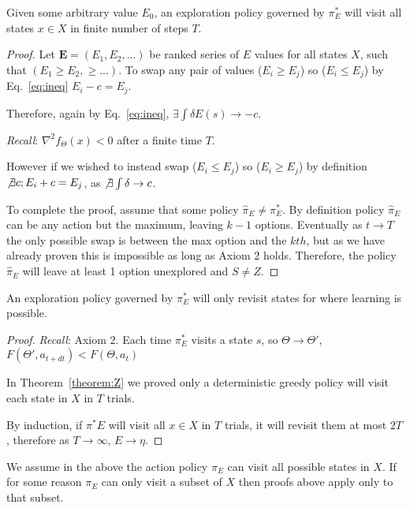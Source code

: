 \begin{theorem} \label{theorem:Z} 
	Given some arbitrary value $E_0$, an exploration policy governed by $\pi^*_E$ will visit all states $x \in X$ in finite number of steps $T$.
\end{theorem}
\begin{proof}
	Let $\mathbf{E} = (E_1, E_2, ...)$ be ranked series of $E$ values for all states $X$, such that $(E_1 \geq E_2, \geq ...)$. To swap any pair of values ($E_i \geq E_j$) so ($E_i \leq E_j$) by Eq.~\ref{eq:ineq} $E_i - c = E_j$. 
	
	Therefore, again by Eq.~\ref{eq:ineq}, $\exists \int \delta E(s) \rightarrow -c$. 
	
	\textit{Recall}: $\nabla^2 f_{\Theta}(x) < 0$ after a finite time $T$.
	
	However if we wished to instead swap ($E_i \leq E_j$) so ($E_i \geq E_j$) by definition $\not \exists c; E_i + c = E_j$, as $\not \exists \int \delta \rightarrow c$. 
	
	To complete the proof, assume that some policy $\hat \pi_E \neq \pi^*_E$. By definition policy $\hat \pi_E$ can be any action but the maximum, leaving $k-1$ options. Eventually as $t \rightarrow T$ the only possible swap is between the max option and the $kth$, but as we have already proven this is impossible as long as Axiom 2 holds. Therefore, the policy $\hat \pi_E$ will leave at least 1 option unexplored and $S \neq Z$. 
\end{proof}
\begin{theorem} \label{theorem:convergence} 
	An exploration policy governed by $\pi^*_E$ will only revisit states for where learning is possible.
\end{theorem}
\begin{proof}
	\textit{Recall}: Axiom 2. Each time $\pi^*_E$ visits a state $s$, so $\Theta \rightarrow \Theta'$, $F(\Theta', a_{t+dt}) < F(\Theta, a_t)$
	
	In Theorem~\ref{theorem:Z} we proved only a deterministic greedy policy will visit each state in $X$ in $T$ trials.
	
	By induction, if $\pi^*E$ will visit all $x \in X$ in $T$ trials, it will revisit them at most $2T$, therefore as $T \rightarrow \infty$, $E \rightarrow \eta$. 
\end{proof}

We assume in the above the action policy $\pi_E$ can visit all possible states in $X$. If for some reason $\pi_E$ can only visit a subset of $X$ then proofs above apply only to that subset. 

